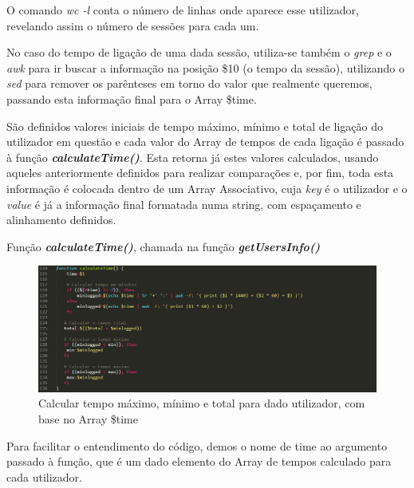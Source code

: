 \documentclass[10pt,portuguese]{article}
\begin{document}
\par O comando \textit{wc -l} conta o número de linhas onde aparece esse utilizador, revelando assim o número de sessões para cada um.
\par No caso do tempo de ligação de uma dada sessão, utiliza-se também o \textit{grep} e o \textit{awk} para ir buscar a informação na posição \$10 (o tempo da sessão), utilizando o \textit{sed} para remover os parênteses em torno do valor que realmente queremos, passando esta informação final para o Array \$time.
\par São definidos valores iniciais de tempo máximo, mínimo e total de ligação do utilizador em questão e cada valor do Array de tempos de cada ligação é passado à função \textbf{\textit{calculateTime()}}. Esta retorna já estes valores calculados, usando aqueles anteriormente definidos para realizar comparações e, por fim, toda esta informação é colocada dentro de um Array Associativo, cuja \textit{key} é o utilizador e o \textit{value} é já a informação final formatada numa string, com espaçamento e alinhamento definidos.
\newline\newline\newline\newline\newline\newline\newline
\par Função \textbf{\textit{calculateTime()}}, chamada na função \textbf{\textit{getUsersInfo()}} 
\begin{figure}[!h]
    \centering
    \includegraphics[width=\textwidth]{calculateTime.png}
    \caption{Calcular tempo máximo, mínimo e total para dado utilizador, com base no Array \$time}
\end{figure}
\par Para facilitar o entendimento do código, demos o nome de time ao argumento passado à função, que é um dado elemento do Array de tempos calculado para cada utilizador.
\end{document}
